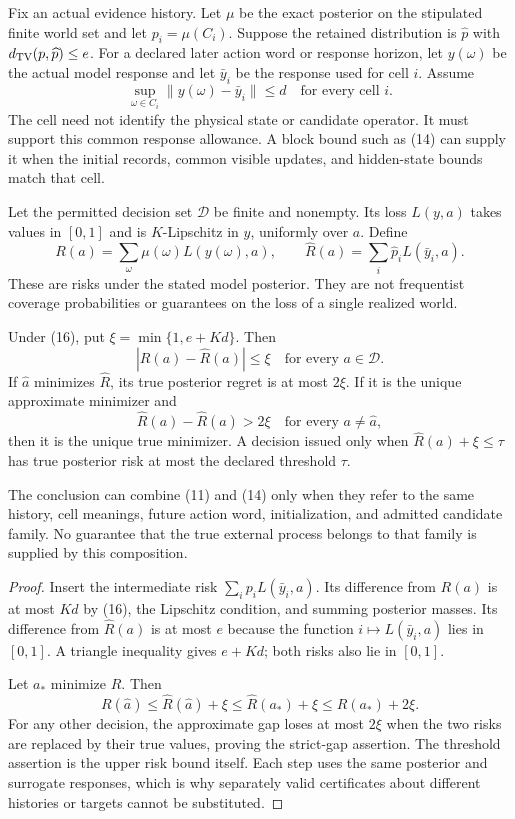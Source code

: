 Fix an actual evidence history. Let $\mu$ be the exact posterior on the stipulated finite world set and let $p_i=\mu(C_i)$. Suppose the retained distribution is $\widehat p$ with $d_{\mathrm{TV}}(p,\widehat p)\le e$. For a declared later action word or response horizon, let $y(\omega)$ be the actual model response and let $\bar y_i$ be the response used for cell $i$. Assume
\[
 \sup_{\omega\in C_i}\|y(\omega)-\bar y_i\|\le d
 \quad\text{for every cell }i. \tag{16}
\]
The cell need not identify the physical state or candidate operator. It must support this common response allowance. A block bound such as (14) can supply it when the initial records, common visible updates, and hidden-state bounds match that cell.

Let the permitted decision set $\mathcal D$ be finite and nonempty. Its loss $L(y,a)$ takes values in $[0,1]$ and is $K$-Lipschitz in $y$, uniformly over $a$. Define
\[
 R(a)=\sum_{\omega}\mu(\omega)L(y(\omega),a),\qquad
 \widehat R(a)=\sum_i\widehat p_iL(\bar y_i,a).
\]
These are risks under the stated model posterior. They are not frequentist coverage probabilities or guarantees on the loss of a single realized world.

\begin{GAtheorem}\label{GA:thm:jointrisk}
Under (16), put $\xi=\min\{1,e+Kd\}$. Then
\[
 |R(a)-\widehat R(a)|\le\xi\quad\text{for every }a\in\mathcal D.
\]
If $\widehat a$ minimizes $\widehat R$, its true posterior regret is at most $2\xi$. If it is the unique approximate minimizer and
\[
 \widehat R(a)-\widehat R(\widehat a)>2\xi\quad\text{for every }a\ne\widehat a,
\]
then it is the unique true minimizer. A decision issued only when $\widehat R(a)+\xi\le\tau$ has true posterior risk at most the declared threshold $\tau$.

The conclusion can combine (11) and (14) only when they refer to the same history, cell meanings, future action word, initialization, and admitted candidate family. No guarantee that the true external process belongs to that family is supplied by this composition.
\end{GAtheorem}
\begin{proof}
Insert the intermediate risk $\sum_ip_iL(\bar y_i,a)$. Its difference from $R(a)$ is at most $Kd$ by (16), the Lipschitz condition, and summing posterior masses. Its difference from $\widehat R(a)$ is at most $e$ because the function $i\mapsto L(\bar y_i,a)$ lies in $[0,1]$. A triangle inequality gives $e+Kd$; both risks also lie in $[0,1]$.

Let $a_*$ minimize $R$. Then
\[
 R(\widehat a)\le\widehat R(\widehat a)+\xi
 \le\widehat R(a_*)+\xi\le R(a_*)+2\xi.
\]
For any other decision, the approximate gap loses at most $2\xi$ when the two risks are replaced by their true values, proving the strict-gap assertion. The threshold assertion is the upper risk bound itself. Each step uses the same posterior and surrogate responses, which is why separately valid certificates about different histories or targets cannot be substituted.
\end{proof}

